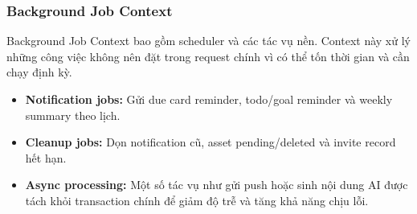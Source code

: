 \subsubsection{Background Job Context}
\label{subsubsec:background-job-context}

Background Job Context bao gồm scheduler và các tác vụ nền. Context này xử lý những công việc không nên đặt trong request chính vì có thể tốn thời gian và cần chạy định kỳ.

\begin{itemize}
    \item \textbf{Notification jobs:} Gửi due card reminder, todo/goal reminder và weekly summary theo lịch.
    \item \textbf{Cleanup jobs:} Dọn notification cũ, asset pending/deleted và invite record hết hạn.
    \item \textbf{Async processing:} Một số tác vụ như gửi push hoặc sinh nội dung AI được tách khỏi transaction chính để giảm độ trễ và tăng khả năng chịu lỗi.
\end{itemize}